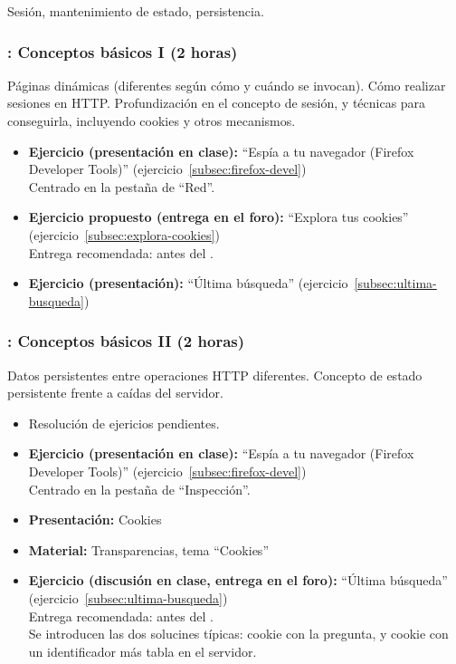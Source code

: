 \documentclass[a4paper,12pt]{article}
\begin{document}
Sesión, mantenimiento de estado, persistencia.

\subsubsection{\juevesA: Conceptos básicos I (2 horas)}
\label{cal:juevesA}

Páginas dinámicas (diferentes según cómo y cuándo se invocan). Cómo realizar sesiones en HTTP. Profundización en el concepto de sesión, y técnicas para conseguirla, incluyendo cookies y otros mecanismos.

\begin{itemize}
\item \textbf{Ejercicio (presentación en clase):} ``Espía a tu navegador (Firefox Developer Tools)'' (ejercicio~\ref{subsec:firefox-devel}) \\
  Centrado en la pestaña de ``Red''.
\item \textbf{Ejercicio propuesto (entrega en el foro):} ``Explora tus cookies'' (ejercicio~\ref{subsec:explora-cookies}) \\
  Entrega recomendada: antes del \juevesB.
\item \textbf{Ejercicio (presentación):} ``Última búsqueda'' (ejercicio~\ref{subsec:ultima-busqueda})
\end{itemize}


\subsubsection{\juevesB: Conceptos básicos II (2 horas)}
\label{cal:juevesB}

Datos persistentes entre operaciones HTTP diferentes. Concepto de estado persistente frente a caídas del servidor.

\begin{itemize}
\item Resolución de ejericios pendientes.
\item \textbf{Ejercicio (presentación en clase):} ``Espía a tu navegador (Firefox Developer Tools)'' (ejercicio~\ref{subsec:firefox-devel}) \\
  Centrado en la pestaña de ``Inspección''.
\item \textbf{Presentación:} Cookies
\item \textbf{Material:} Transparencias, tema ``Cookies''
\item \textbf{Ejercicio (discusión en clase, entrega en el foro):} ``Última búsqueda'' (ejercicio~\ref{subsec:ultima-busqueda}) \\
  Entrega recomendada: antes del \juevesC. \\
  Se introducen las dos solucines típicas: cookie con la pregunta, y cookie con un identificador más tabla en el servidor.
\end{itemize}
\end{document}
